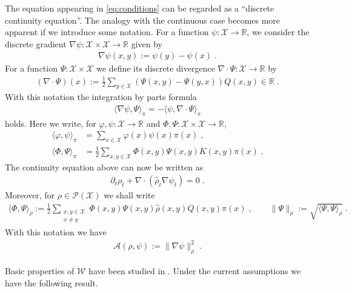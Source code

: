 \documentclass[a4paper,11pt,reqno]{amsart}
\theoremstyle{plain}
\theoremstyle{remark}
\numberwithin{equation}{section}
\begin{document}
The equation appearing in \eqref{eq:conditions} can be regarded as a
``discrete continuity equation''. The analogy with the continuous case
becomes more apparent if we introduce some notation.  For a function
$\psi : {\mathcal{X}} \to {{\mathbb R}}$, we consider the discrete gradient $\nabla \psi :
{\mathcal{X}} \times {\mathcal{X}} \to {{\mathbb R}}$ given by
\begin{align*}
 \nabla \psi(x,y) := \psi(y) - \psi(x)\;.
\end{align*}
For a function $\Psi : {\mathcal{X}} \times {\mathcal{X}}$ we define its
discrete divergence $\nabla \cdot \Psi : {\mathcal{X}} \to {{\mathbb R}}$ by
\begin{align*}
( \nabla \cdot \Psi )(x) 
  := \frac12 \sum_{y \in {\mathcal{X}}}  (\Psi(x,y) - \Psi(y,x) ) Q(x,y) \in {{\mathbb R}}\;.
\end{align*}
With this notation the integration by parts formula
\begin{align*}
 {\langle {{\nabla \psi, \Psi}}\rangle}_\pi = -{\langle {{\psi,\nabla\cdot \Psi}}\rangle}_\pi
\end{align*}
holds. Here we write, for ${\varphi},\psi : {\mathcal{X}} \to {{\mathbb R}}$ and $\Phi,\Psi : {\mathcal{X}} \times{\mathcal{X}} \to {{\mathbb R}}$,
\begin{align*}
{\langle {{{\varphi}, \psi}}\rangle}_\pi &= \sum_{x \in {\mathcal{X}}} {\varphi}(x) \psi(x) \pi(x)\;, \\
{\langle {{\Phi, \Psi}}\rangle}_\pi &= \frac12 \sum_{x,y \in {\mathcal{X}}} 
         \Phi(x,y) \Psi(x,y) K(x,y) \pi(x)\;.
\end{align*}
The continuity equation above can now be written as
\begin{align*}
 \partial_t \rho_t + \nabla \cdot ({\hat\rho}_t \nabla \psi_t) = 0\;.
\end{align*}
Moreover, for $\rho \in {{\mathscr{P}}({\mathcal{X}})}$ we shall write 
\begin{align*}
 {\langle {{\Phi, \Psi }}\rangle}_\rho
   := 
   \frac12\sum_{\substack{x, y \in {\mathcal{X}}\\x\neq y}} \Phi(x,y)\Psi(x,y) {\hat\rho}(x,y) Q(x,y) \pi(x)\;,\qquad
   \| \Psi\|_\rho := \sqrt{ {\langle {{\Psi, \Psi }}\rangle}_\rho}\;.
\end{align*}
With this notation we have 
\begin{align*}
{\mathcal{A}}(\rho, \psi):= \| \nabla \psi\|_\rho^2\;.
\end{align*}

Basic properties of ${\mathcal{W}}$ have been studied in \cite{Ma11}. Under the
current assumptions we have the following result.
\end{document}
